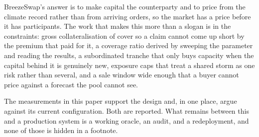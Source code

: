 \documentclass[11pt,a4paper]{article}
\begin{document}
BreezeSwap's answer is to make capital the counterparty and to price from the climate record
rather than from arriving orders, so the market has a price before it has participants. The
work that makes this more than a slogan is in the constraints: gross collateralisation of
cover so a claim cannot come up short by the premium that paid for it, a coverage ratio
derived by sweeping the parameter and reading the results, a subordinated tranche that only
buys capacity when the capital behind it is genuinely new, exposure caps that treat a shared
storm as one risk rather than several, and a sale window wide enough that a buyer cannot
price against a forecast the pool cannot see.

The measurements in this paper support the design and, in one place, argue against its
current configuration. Both are reported. What remains between this and a production system
is a working oracle, an audit, and a redeployment, and none of those is hidden in a footnote.
\end{document}
